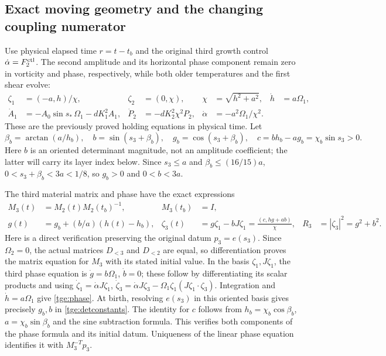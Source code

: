\subsection{Exact moving geometry and the changing coupling numerator}

Use physical elapsed time $r=t-t_b$ and the original third growth
control $\dot\alpha=F_2^{\rm ctl}$. The second amplitude and its
horizontal phase component remain zero in vorticity and phase,
respectively, while both older temperatures and the first shear evolve:
\begin{align}
 \zeta_1&=(-a,h)/\chi,&\zeta_2&=(0,\chi),&
 \chi&=\sqrt{h^2+a^2},&\dot h&=a\Omega_1,\nonumber\\
 \dot A_1&=-A_0\sin s_*\,\Omega_1-dK_1^2A_1,&
 \dot P_2&=-dK_2^2\chi^2P_2,&
 \dot\alpha&=-a^2\Omega_1/\chi^2.
 \label{tge:older_hold}
\end{align}
These are the previously proved holding equations in physical time.
Let
\begin{equation}\label{tge:detconstants}
 \beta_b=\arctan(a/h_b),\quad
 b=\sin(s_3+\beta_b),\quad g_b=\cos(s_3+\beta_b),\quad
 c=bh_b-ag_b=\chi_b\sin s_3>0.
\end{equation}
Here $b$ is an oriented determinant magnitude, not an amplitude
coefficient; the latter will carry its layer index below.
Since $s_3\leq a$ and $\beta_b\leq(16/15)a$,
$0<s_3+\beta_b<3a<1/8$, so $g_b>0$ and $0<b<3a$.

The third material matrix and phase have the exact expressions
\begin{align}
 M_3(t)&=M_2(t)M_2(t_b)^{-1},& M_3(t_b)&=I,\nonumber\\
 g(t)&=g_b+(b/a)(h(t)-h_b),&
 \zeta_3(t)&=g\zeta_1-bJ\zeta_1
       =\frac{(c,hg+ab)}{\chi},& R_3&=|\zeta_3|^2=g^2+b^2.
 \label{tge:phase}
\end{align}
Here is a direct verification preserving the original datum
$p_3=e(s_3)$. Since $\Omega_2=0$, the actual matrices
$D_{<3}$ and $D_{<2}$ are equal, so differentiation proves the
matrix equation for $M_3$ with its stated initial value.
In the basis $\zeta_1,J\zeta_1$, the third phase equation is
$\dot g=b\Omega_1$, $\dot b=0$; these follow by differentiating
its scalar products and using
$\dot\zeta_1=\dot\alpha J\zeta_1$,
$\dot\zeta_3=\dot\alpha J\zeta_3
 -\Omega_1\zeta_1(J\zeta_1\cdot\zeta_3)$.
Integration and $\dot h=a\Omega_1$ give \eqref{tge:phase}.
At birth, resolving $e(s_3)$ in this oriented basis gives precisely
$g_b,b$ in \eqref{tge:detconstants}. The identity for $c$ follows
from $h_b=\chi_b\cos\beta_b$, $a=\chi_b\sin\beta_b$ and
the sine subtraction formula. This verifies both components of the
phase formula and its initial datum. Uniqueness of the linear phase
equation identifies it with $M_3^{-T}p_3$.

